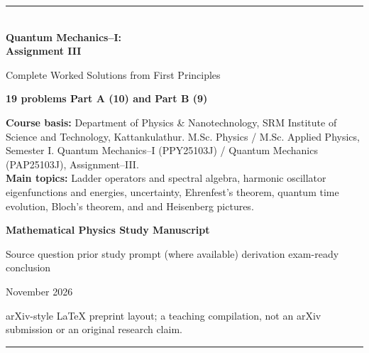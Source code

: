 \documentclass[11pt,a4paper]{article}
\begin{document}
\begin{titlepage}
\thispagestyle{empty}
\vspace*{16mm}
{\color{teal}\rule{\textwidth}{1.5pt}}\\[10mm]
{\sffamily\fontsize{29}{34}\selectfont\bfseries Quantum Mechanics--I:\\[2mm] Assignment III}\par
\vspace{6mm}
{\sffamily\Large Complete Worked Solutions from First Principles}\par
\vspace{10mm}
{\large\textbf{19 problems \textbullet{} Part A (10) and Part B (9)}}\par
\vspace{8mm}
\begin{tcolorbox}[colback=pale,colframe=teal]
\textbf{Course basis:} Department of Physics \& Nanotechnology, SRM Institute of Science and Technology, Kattankulathur. M.Sc. Physics / M.Sc. Applied Physics, Semester I. Quantum Mechanics--I (PPY25103J) / Quantum Mechanics (PAP25103J), Assignment--III.\\[4pt]
\textbf{Main topics:} Ladder operators and spectral algebra, harmonic oscillator eigenfunctions and energies, uncertainty, Ehrenfest's theorem, quantum time evolution, Bloch's theorem, and \Sch{} and Heisenberg pictures.
\end{tcolorbox}
\vspace{9mm}
{\Large\bfseries\color{navy} Mathematical Physics Study Manuscript}\par
\vspace{4mm}
{\normalsize Source question \textbullet{} prior study prompt (where available) \textbullet{} derivation \textbullet{} exam-ready conclusion}\par
\vfill
{\large November 2026}\par
\vspace{3mm}
{\small arXiv-style \LaTeX{} preprint layout; a teaching compilation, not an arXiv submission or an original research claim.}\par
\vspace{8mm}
{\color{teal}\rule{\textwidth}{1.5pt}}
\end{titlepage}
\end{document}
